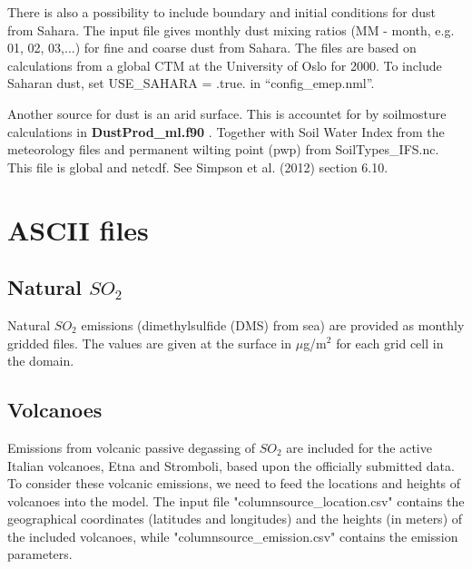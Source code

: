 There is also a possibility to include boundary and initial conditions for dust from Sahara. 
The input file gives monthly dust mixing 
ratios (MM - month, e.g. 01, 02, 03,...) for fine and coarse dust from Sahara. The files are based on calculations 
from a global CTM at the University of Oslo for 2000. 
To include Saharan dust, set USE\_SAHARA = .true. in ``config\_emep.nml''.

Another source for dust is an arid surface. This is accountet for by soilmosture calculations in {\bf DustProd\_ml.f90 }. 
Together with Soil Water Index from the meteorology files and permanent wilting point (pwp) from SoilTypes\_IFS.nc. 
This file is global and netcdf. See Simpson et al. (2012) section 6.10.



\section{ASCII files}


% 
% 
% 
% 



\subsection{Natural $SO_2$}
Natural $SO_2$ emissions (dimethylsulfide (DMS) from sea) are provided 
as monthly gridded files.  
The values are given at the surface in $\mu$g/m$^2$ for each grid cell in the domain. 

\subsection{Volcanoes}

Emissions from volcanic passive degassing of $SO_2$ are included for
the active Italian volcanoes, Etna and Stromboli, based upon the
officially submitted data.
To consider these volcanic emissions, we need to feed the locations
and heights of volcanoes into the model. The input file
"columnsource\_location.csv" contains the geographical coordinates
(latitudes and longitudes) and 
the heights (in meters) of the
included volcanoes, while "columnsource\_emission.csv" contains the
emission parameters.

